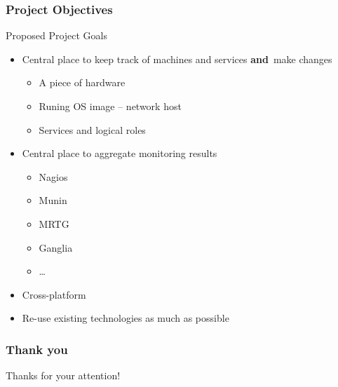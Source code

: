 \documentclass{beamer}
\begin{document}
\begin{frame}[fragile]
\frametitle{Project Objectives}

Proposed Project Goals

\begin{itemize}
    \item Central place to keep track of machines and services {\bf and}~make
        changes
        \begin{itemize}
            \item A piece of hardware
            \item Runing OS image -- network host
            \item Services and logical roles
        \end{itemize}
    \item Central place to aggregate monitoring results
        \begin{itemize}
            \item Nagios
            \item Munin
            \item MRTG
            \item Ganglia
            \item \ldots
        \end{itemize}
    \item Cross-platform
    \item Re-use existing technologies as much as possible
\end{itemize}

\end{frame}

\begin{frame}
\frametitle{Thank you}

\center
{\Large Thanks for your attention!}

\end{frame}
\end{document}
